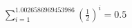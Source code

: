 \documentclass[preview]{standalone}
\begin{document}
\begin{align*}
\sum_{i=1}^{1.0026586969453986} (\frac{1}{2})^i = {0.5}
\end{align*}
\end{document}
